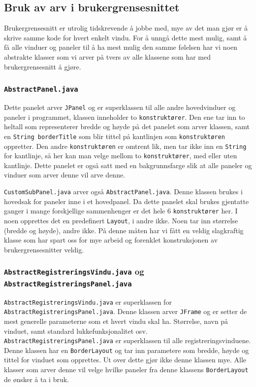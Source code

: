 \subsection{Bruk av arv i brukergrensesnittet}
Brukergrensesnitt er utrolig tidskrevende å jobbe med, mye av det man gjør er å skrive samme kode for hvert enkelt vindu.
For å unngå dette mest mulig, samt å få alle vinduer og paneler til å ha mest mulig den samme følelsen har vi noen abstrakte klasser som vi arver på tvers av alle klassene som har med brukergrensesnitt å gjøre.


\subsubsection*{\texttt{AbstractPanel.java}}
Dette panelet arver \texttt{JPanel} og er superklassen til alle andre hovedvinduer og paneler i programmet, klassen inneholder to \texttt{konstruktører}. Den ene tar inn to heltall som representerer bredde og høyde på det panelet som arver klassen, samt en \texttt{String borderTitle} som blir tittel på kantlinjen som \texttt{konstruktøren} oppretter.
Den andre \texttt{konstruktøren} er omtrent lik, men tar ikke inn en \texttt{String} for kantlinje, så her kan man velge mellom to \texttt{konstruktører}, med eller uten kantlinje.
Dette panelet er også satt med en bakgrunnsfarge slik at alle paneler og vinduer som arver denne vil arve denne.

\texttt{CustomSubPanel.java} arver også \texttt{AbstractPanel.java}. Denne klassen brukes i hovedsak for paneler inne i et hovedpanel. Da dette panelet skal brukes gjentatte ganger i mange forskjellige sammenhenger er det hele 6 \texttt{konstruktører} her. 
I noen opprettes det en predefinert \texttt{Layout}, i andre ikke. Noen tar inn størrelse (bredde og høyde), andre ikke. På denne måten har vi fått en veldig slagkraftig klasse som har spart oss for mye arbeid og forenklet konstruksjonen av brukergrensesnitter veldig.


\subsubsection*{\texttt{AbstractRegistreringsVindu.java} og \texttt{AbstractRegistreringsPanel.java}}
\texttt{AbstractRegistreringsVindu.java} er superklassen for \texttt{AbstractRegistreringsPanel.java}. Denne klassen arver \texttt{JFrame} og er setter de mest generelle parameterne som et hvert vindu skal ha. Størrelse, navn på vinduet, samt standard lukkefunksjonalitet osv.
\texttt{AbstractRegistreringsPanel.java} er superklassen til alle registreringsvinduene. Denne klassen har en \texttt{BorderLayout} og tar inn parametere som bredde, høyde og tittel for vinduet som opprettes. Ut over dette gjør ikke denne klassen mye. Alle klasser som arver denne vil velge hvilke paneler fra denne klassens \texttt{BorderLayout} de ønsker å ta i bruk.


